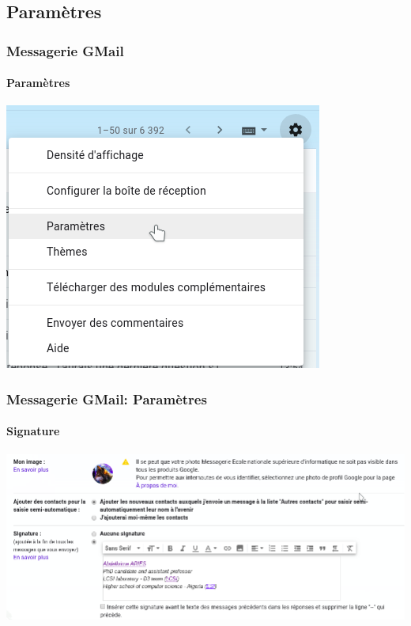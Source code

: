 \documentclass[xcolor=table]{beamer}
\begin{document}
\subsection{Paramètres}

\begin{frame}
\frametitle{Messagerie GMail}
\framesubtitle{Paramètres}

\begin{center}
	\includegraphics[height=.85\textheight]{..//img/Bweb02-ri-gmail/gmail-parametre.png}
\end{center}

\end{frame}

\begin{frame}
\frametitle{Messagerie GMail: Paramètres}
\framesubtitle{Signature}

\begin{center}
	\includegraphics[height=.85\textheight]{..//img/Bweb02-ri-gmail/gmail-parametre-signature.png}
\end{center}

\end{frame}
\end{document}
